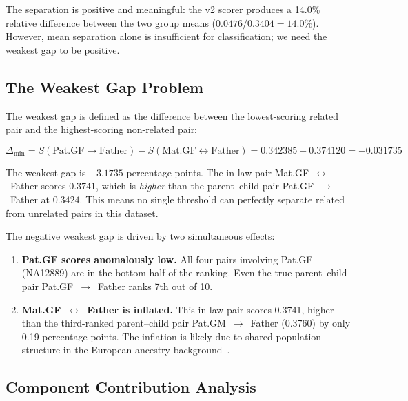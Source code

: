 \documentclass{../yalumba}
\begin{document}
The separation is positive and meaningful: the v2 scorer produces a 14.0\%
relative difference between the two group means
($0.0476 / 0.3404 = 14.0\%$).  However, mean separation alone is insufficient
for classification; we need the weakest gap to be positive.

\subsection{The Weakest Gap Problem}

The weakest gap is defined as the difference between the lowest-scoring
related pair and the highest-scoring non-related pair:

\begin{equation}
  \Delta_{\min} = S(\text{Pat.GF} \to \text{Father})
                  - S(\text{Mat.GF} \leftrightarrow \text{Father})
               = 0.342385 - 0.374120 = -0.031735
\end{equation}

\begin{limitation}
The weakest gap is $-3.1735$ percentage points.  The in-law pair
Mat.GF~$\leftrightarrow$~Father scores $0.3741$, which is \emph{higher} than
the parent--child pair Pat.GF~$\to$~Father at $0.3424$.  This means no
single threshold can perfectly separate related from unrelated pairs in this
dataset.
\end{limitation}

The negative weakest gap is driven by two simultaneous effects:

\begin{enumerate}
  \item \textbf{Pat.GF scores anomalously low.}  All four pairs involving
        Pat.GF (NA12889) are in the bottom half of the ranking.  Even the
        true parent--child pair Pat.GF~$\to$~Father ranks 7th out of 10.
  \item \textbf{Mat.GF~$\leftrightarrow$~Father is inflated.}  This in-law
        pair scores 0.3741, higher than the third-ranked parent--child pair
        Pat.GM~$\to$~Father (0.3760) by only 0.19 percentage points.  The
        inflation is likely due to shared population structure in the European
        ancestry background~\cite{ralph2013ancestry}.
\end{enumerate}

\subsection{Component Contribution Analysis}
\end{document}
